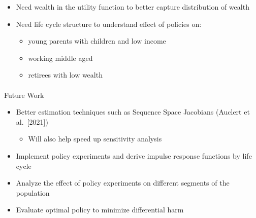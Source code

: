 \documentclass[
  letterpaper,
  DIV=11,
  numbers=noendperiod]{scrartcl}
\makeatletter
\let\oldparagraph\paragraph
\renewcommand{\paragraph}{
    \@ifstar
      \xxxParagraphStar
      \xxxParagraphNoStar
  }
\newcommand{\xxxParagraphStar}[1]{\oldparagraph*{#1}\mbox{}}
\newcommand{\xxxParagraphNoStar}[1]{\oldparagraph{#1}\mbox{}}
\providecommand{\tightlist}{%
  \setlength{\itemsep}{0pt}\setlength{\parskip}{0pt}}\usepackage{longtable,booktabs,array}
\makeatother
\begin{document}
\begin{itemize}
\tightlist
\item
  Need wealth in the utility function to better capture distribution of
  wealth
\item
  Need life cycle structure to understand effect of policies on:

  \begin{itemize}
  \tightlist
  \item
    young parents with children and low income
  \item
    working middle aged
  \item
    retirees with low wealth
  \end{itemize}
\end{itemize}

\paragraph{Future Work}\label{future-work}

\begin{itemize}
\tightlist
\item
  Better estimation techniques such as Sequence Space Jacobians (Auclert
  et al.~{[}2021{]})

  \begin{itemize}
  \tightlist
  \item
    Will also help speed up sensitivity analysis
  \end{itemize}
\item
  Implement policy experiments and derive impulse response functions by
  life cycle
\item
  Analyze the effect of policy experiments on different segments of the
  population
\item
  Evaluate optimal policy to minimize differential harm
\end{itemize}
\end{document}
